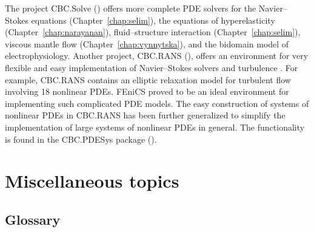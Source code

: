 The project CBC.Solve () offers
more complete PDE solvers for the Navier--Stokes equations
(Chapter~\ref{chap:selim}), the equations of hyperelasticity
(Chapter~\ref{chap:narayanan}), fluid--structure interaction
(Chapter~\ref{chap:selim}), viscous mantle flow
(Chapter~\ref{chap:vynnytska}), and the bidomain model of
electrophysiology.  Another project, CBC.RANS
(), offers an environment for very
flexible and easy implementation
of Navier--Stokes solvers and turbulence
\citep{Mortensen2011,Mortensen2011b}. For example,
CBC.RANS contains an elliptic relaxation model for turbulent flow
involving 18 nonlinear PDEs. FEniCS proved to be an ideal environment
for implementing such complicated PDE models.
The easy construction of systems of nonlinear PDEs in CBC.RANS has been
further generalized to simplify the implementation of large systems
of nonlinear PDEs in general. The functionality is found in the
CBC.PDESys package ().

\clearpage

\section{Miscellaneous topics}


\subsection{Glossary}

